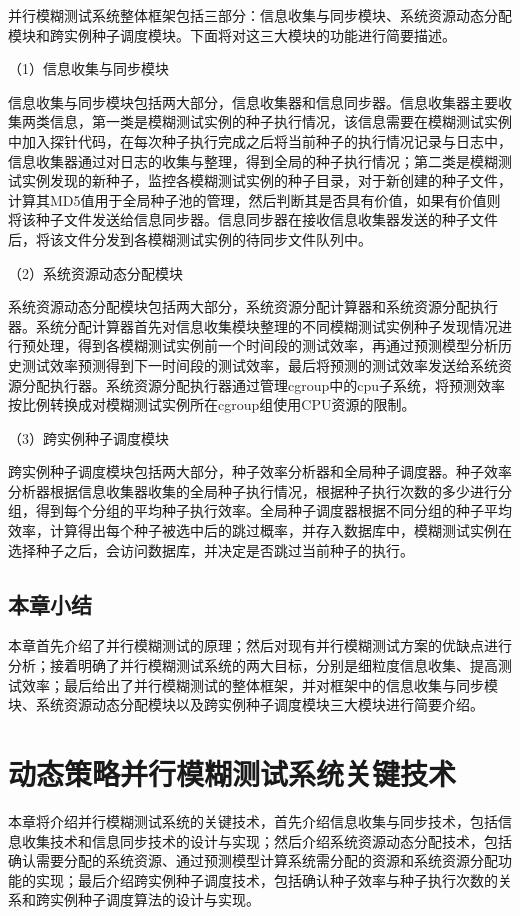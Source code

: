 \documentclass[master]{thesis-uestc}
\begin{document}
并行模糊测试系统整体框架包括三部分：信息收集与同步模块、系统资源动态分配模块和跨实例种子调度模块。下面将对这三大模块的功能进行简要描述。

（1）信息收集与同步模块

信息收集与同步模块包括两大部分，信息收集器和信息同步器。信息收集器主要收集两类信息，第一类是模糊测试实例的种子执行情况，该信息需要在模糊测试实例中加入探针代码，在每次种子执行完成之后将当前种子的执行情况记录与日志中，信息收集器通过对日志的收集与整理，得到全局的种子执行情况；第二类是模糊测试实例发现的新种子，监控各模糊测试实例的种子目录，对于新创建的种子文件，计算其MD5值用于全局种子池的管理，然后判断其是否具有价值，如果有价值则将该种子文件发送给信息同步器。信息同步器在接收信息收集器发送的种子文件后，将该文件分发到各模糊测试实例的待同步文件队列中。

（2）系统资源动态分配模块

系统资源动态分配模块包括两大部分，系统资源分配计算器和系统资源分配执行器。系统分配计算器首先对信息收集模块整理的不同模糊测试实例种子发现情况进行预处理，得到各模糊测试实例前一个时间段的测试效率，再通过预测模型分析历史测试效率预测得到下一时间段的测试效率，最后将预测的测试效率发送给系统资源分配执行器。系统资源分配执行器通过管理cgroup中的cpu子系统，将预测效率按比例转换成对模糊测试实例所在cgroup组使用CPU资源的限制。

（3）跨实例种子调度模块

跨实例种子调度模块包括两大部分，种子效率分析器和全局种子调度器。种子效率分析器根据信息收集器收集的全局种子执行情况，根据种子执行次数的多少进行分组，得到每个分组的平均种子执行效率。全局种子调度器根据不同分组的种子平均效率，计算得出每个种子被选中后的跳过概率，并存入数据库中，模糊测试实例在选择种子之后，会访问数据库，并决定是否跳过当前种子的执行。

\section{本章小结}
本章首先介绍了并行模糊测试的原理；然后对现有并行模糊测试方案的优缺点进行分析；接着明确了并行模糊测试系统的两大目标，分别是细粒度信息收集、提高测试效率；最后给出了并行模糊测试的整体框架，并对框架中的信息收集与同步模块、系统资源动态分配模块以及跨实例种子调度模块三大模块进行简要介绍。 

\chapter{动态策略并行模糊测试系统关键技术}

本章将介绍并行模糊测试系统的关键技术，首先介绍信息收集与同步技术，包括信息收集技术和信息同步技术的设计与实现；然后介绍系统资源动态分配技术，包括确认需要分配的系统资源、通过预测模型计算系统需分配的资源和系统资源分配功能的实现；最后介绍跨实例种子调度技术，包括确认种子效率与种子执行次数的关系和跨实例种子调度算法的设计与实现。
\end{document}
